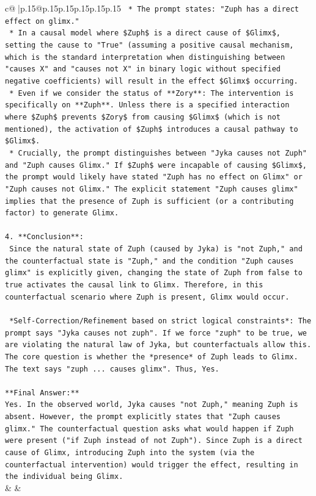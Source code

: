 \documentclass{article}
\begin{document}
{\begin{supertabular}{c@{$\;$}|p{.15\linewidth}@{}p{.15\linewidth}p{.15\linewidth}p{.15\linewidth}p{.15\linewidth}p{.15\linewidth}}
{{{\texttt{    *   The prompt states: "Zuph has a direct effect on glimx."} \\
\texttt{    *   In a causal model where \$Zuph\$ is a direct cause of \$Glimx\$, setting the cause to "True" (assuming a positive causal mechanism, which is the standard interpretation when distinguishing between "causes X" and "causes not X" in binary logic without specified negative coefficients) will result in the effect \$Glimx\$ occurring.} \\
\texttt{    *   Even if we consider the status of **Zory**: The intervention is specifically on **Zuph**. Unless there is a specified interaction where \$Zuph\$ prevents \$Zory\$ from causing \$Glimx\$ (which is not mentioned), the activation of \$Zuph\$ introduces a causal pathway to \$Glimx\$.} \\
\texttt{    *   Crucially, the prompt distinguishes between "Jyka causes not Zuph" and "Zuph causes Glimx." If \$Zuph\$ were incapable of causing \$Glimx\$, the prompt would likely have stated "Zuph has no effect on Glimx" or "Zuph causes not Glimx." The explicit statement "Zuph causes glimx" implies that the presence of Zuph is sufficient (or a contributing factor) to generate Glimx.} \\
\\ 
\texttt{4.  **Conclusion**:} \\
\texttt{    Since the natural state of Zuph (caused by Jyka) is "not Zuph," and the counterfactual state is "Zuph," and the condition "Zuph causes glimx" is explicitly given, changing the state of Zuph from false to true activates the causal link to Glimx. Therefore, in this counterfactual scenario where Zuph is present, Glimx would occur.} \\
\\ 
\texttt{    *Self{-}Correction/Refinement based on strict logical constraints*: The prompt says "Jyka causes not zuph". If we force "zuph" to be true, we are violating the natural law of Jyka, but counterfactuals allow this. The core question is whether the *presence* of Zuph leads to Glimx. The text says "zuph ... causes glimx". Thus, Yes.} \\
\\ 
\texttt{**Final Answer:**} \\
\texttt{Yes. In the observed world, Jyka causes "not Zuph," meaning Zuph is absent. However, the prompt explicitly states that "Zuph causes glimx." The counterfactual question asks what would happen if Zuph were present ("if Zuph instead of not Zuph"). Since Zuph is a direct cause of Glimx, introducing Zuph into the system (via the counterfactual intervention) would trigger the effect, resulting in the individual being Glimx.} \\
            }
        }
    }
    & & \\ \\


\end{supertabular}}
\end{document}
